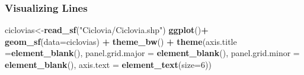 \documentclass[
  shownotes,
  xcolor={svgnames},
  hyperref={colorlinks,citecolor=DarkBlue,linkcolor=DarkRed,urlcolor=DarkBlue}
  ]{beamer}
\newenvironment{Shaded}{\begin{snugshade}}{\end{snugshade}}
\newcommand{\DataTypeTok}[1]{\textcolor[rgb]{0.13,0.29,0.53}{#1}}
\newcommand{\DecValTok}[1]{\textcolor[rgb]{0.00,0.00,0.81}{#1}}
\newcommand{\KeywordTok}[1]{\textcolor[rgb]{0.13,0.29,0.53}{\textbf{#1}}}
\newcommand{\NormalTok}[1]{#1}
\newcommand{\OperatorTok}[1]{\textcolor[rgb]{0.81,0.36,0.00}{\textbf{#1}}}
\newcommand{\StringTok}[1]{\textcolor[rgb]{0.31,0.60,0.02}{#1}}
\begin{document}
\begin{frame}[fragile]
\frametitle{Visualizing Lines}



\begin{minipage}[t]{0.52\linewidth}
        \begin{scriptsize}

\begin{Shaded}
\begin{Highlighting}[]
\NormalTok{ciclovias\textless{}{-}}\KeywordTok{read\_sf}\NormalTok{(}\StringTok{"Ciclovia/Ciclovia.shp"}\NormalTok{)}
\KeywordTok{ggplot}\NormalTok{()}\OperatorTok{+}
\StringTok{  }\KeywordTok{geom\_sf}\NormalTok{(}\DataTypeTok{data=}\NormalTok{ciclovias) }\OperatorTok{+}
\StringTok{  }\KeywordTok{theme\_bw}\NormalTok{() }\OperatorTok{+}
\StringTok{  }\KeywordTok{theme}\NormalTok{(}\DataTypeTok{axis.title =}\KeywordTok{element\_blank}\NormalTok{(),}
        \DataTypeTok{panel.grid.major =} \KeywordTok{element\_blank}\NormalTok{(),}
        \DataTypeTok{panel.grid.minor =} \KeywordTok{element\_blank}\NormalTok{(),}
        \DataTypeTok{axis.text =} \KeywordTok{element\_text}\NormalTok{(}\DataTypeTok{size=}\DecValTok{6}\NormalTok{))}
\end{Highlighting}
\end{Shaded}
   \end{scriptsize}
    \end{minipage}
    \hfill
    \begin{minipage}[t]{0.43\linewidth}%
        \begin{figure}[H] \centering
            \captionsetup{justification=centering}  


\end{figure}
\end{minipage}
\end{frame}
\end{document}
